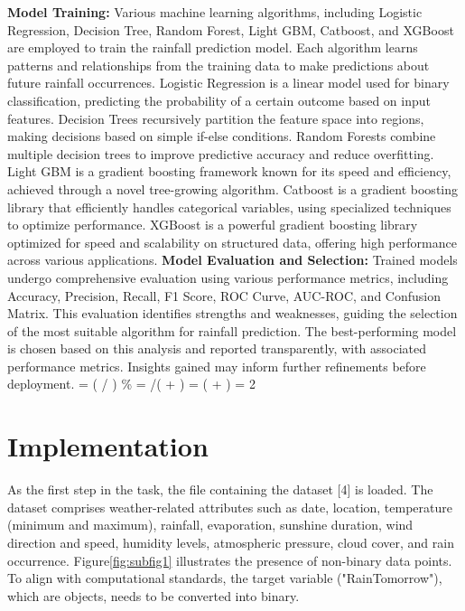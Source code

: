 \documentclass{josis}
\begin{document}
\begin{description}
\textbf{Model Training:} Various machine learning algorithms, including Logistic Regression, Decision Tree, Random Forest, Light GBM, Catboost, and XGBoost are employed to train the rainfall prediction model. Each algorithm learns patterns and relationships from the training data to make predictions about future rainfall occurrences.
    Logistic Regression is a linear model used for binary classification, predicting the probability of a certain outcome based on input features. Decision Trees recursively partition the feature space into regions, making decisions based on simple if-else conditions. Random Forests combine multiple decision trees to improve predictive accuracy and reduce overfitting. Light GBM is a gradient boosting framework known for its speed and efficiency, achieved through a novel tree-growing algorithm. Catboost is a gradient boosting library that efficiently handles categorical variables, using specialized techniques to optimize performance. XGBoost is a powerful gradient boosting library optimized for speed and scalability on structured data, offering high performance across various applications. 
\newline
\textbf{Model Evaluation and Selection:} Trained models undergo comprehensive evaluation using various performance metrics, including Accuracy, Precision, Recall, F1 Score, ROC Curve, AUC-ROC, and Confusion Matrix. This evaluation identifies strengths and weaknesses, guiding the selection of the most suitable algorithm for rainfall prediction. The best-performing model is chosen based on this analysis and reported transparently, with associated performance metrics. Insights gained may inform further refinements before deployment.
\newline
{} = ( / ) \%
\newline
{} = /( + )
\newline
{} = ( + )
\newline
{} = 2 \times {}

\end{description} 
\section{Implementation}
As the first step in the task, the file containing the dataset [4] is loaded. The dataset comprises weather-related attributes such as date, location, temperature (minimum and maximum), rainfall, evaporation, sunshine duration, wind direction and speed, humidity levels, atmospheric pressure, cloud cover, and rain occurrence. Figure\ref{fig:subfig1} illustrates the presence of non-binary data points. To align with computational standards, the target variable ("RainTomorrow"), which are objects, needs to be converted into binary.
\end{document}
